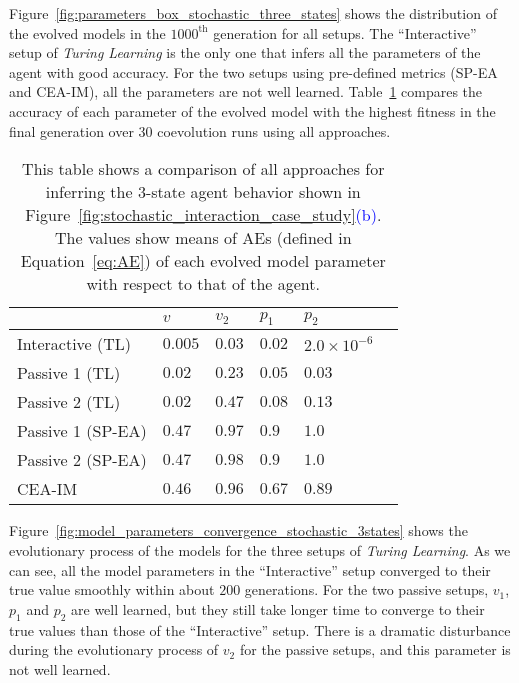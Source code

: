Figure~\ref{fig:parameters_box_stochastic_three_states} shows the distribution of the evolved models in the $1000^\mathrm{th}$ generation for all setups. The ``Interactive'' setup of \textit{Turing Learning} is the only one that infers all the parameters of the agent with good accuracy. For the two setups using pre-defined metrics (SP-EA and CEA-IM), all the parameters are not well learned. Table~\ref{table:relative_accuracy_stochastic_3states} compares the accuracy of each parameter of the evolved model with the highest fitness in the final generation over $30$ coevolution runs using all approaches.

\begin{table}[!t] 
\caption{This table shows a comparison of all approaches for inferring the 3-state agent behavior shown in Figure~\ref{fig:stochastic_interaction_case_study}\textcolor{blue}{(b)}. The values show means of AEs (defined in Equation~\ref{eq:AE}) of each evolved model parameter with respect to that of the agent.} 
\renewcommand{\arraystretch}{1.1}
\centering %
\begin{tabular}{l l l l l l} %
\hline\hline  %
 & $v$ & $v_2$ & $p_1$ & $p_2$ &  \\  
\hline   %
Interactive (TL) & $0.005$ & $0.03$ & $0.02$ & $2.0\times10^{-6}$ \\ %
Passive 1 (TL) & $0.02$ & $0.23$ & $0.05$ & $0.03$\\ 
Passive 2 (TL) & $0.02$ & $0.47$ & $0.08$ & $0.13$\\ 
Passive 1 (SP-EA) & $0.47$ & $0.97$ & $0.9$ & $1.0$\\ 
Passive 2 (SP-EA) & $0.47$ & $0.98$ & $0.9$ & $1.0$\\ 
CEA-IM & $0.46$ & $0.96$ & $0.67$ & $0.89$\\
\hline %
\end{tabular} 
\label{table:relative_accuracy_stochastic_3states} 
\end{table} 

Figure~\ref{fig:model_parameters_convergence_stochastic_3states} shows the evolutionary process of the models for the three setups of \textit{Turing Learning}. As we can see, all the model parameters in the ``Interactive'' setup converged to their true value smoothly within about $200$ generations. For the two passive setups, $v_1$, $p_1$ and $p_2$ are well learned, but they still take longer time to converge to their true values than those of the ``Interactive'' setup. There is a dramatic disturbance during the evolutionary process of $v_2$ for the passive setups, and this parameter is not well learned.

